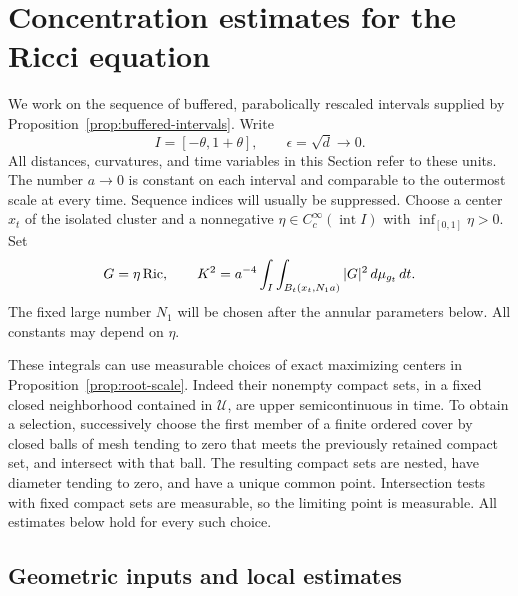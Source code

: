 \section{Concentration estimates for the Ricci equation}
\label{sec:parabolic}

We work on the sequence of buffered, parabolically rescaled intervals supplied
by Proposition~\ref{prop:buffered-intervals}.  Write
\[
 I=[-\theta,1+\theta],\qquad \epsilon=\sqrt d\longrightarrow0.
\]
All distances, curvatures, and time variables in this Section refer to these
units.  The number $a\to0$ is constant on each interval and comparable to the
outermost scale at every time.  Sequence indices will usually be suppressed.
Choose a center $x_t$ of the isolated cluster and a nonnegative
$\eta\in C_c^\infty(\operatorname{int}I)$ with $\inf_{[0,1]}\eta>0$.  Set
\begin{equation}
 G=\eta\operatorname{Ric},\qquad
 K^2=a^{-4}\int_I\int_{B_t(x_t,N_1a)}|G|^2\,d\mu_{g_t}\,dt.
 \label{eq:root-energy}
\end{equation}
The fixed large number $N_1$ will be chosen after the annular parameters below.
All constants may depend on $\eta$.

These integrals can use measurable choices of exact maximizing centers in
Proposition~\ref{prop:root-scale}.  Indeed their nonempty compact sets, in a
fixed closed neighborhood contained in $\mathcal U$, are upper
semicontinuous in time.  To obtain a selection, successively choose the first
member of a finite ordered cover by closed balls of mesh tending to zero that
meets the previously retained compact set, and intersect with that ball.
The resulting compact sets are nested, have diameter tending to zero, and
have a unique common point.  Intersection tests with fixed compact sets are
measurable, so the limiting point is measurable.  All estimates below hold
for every such choice.

\subsection{Geometric inputs and local estimates}
\label{para:inputs}

